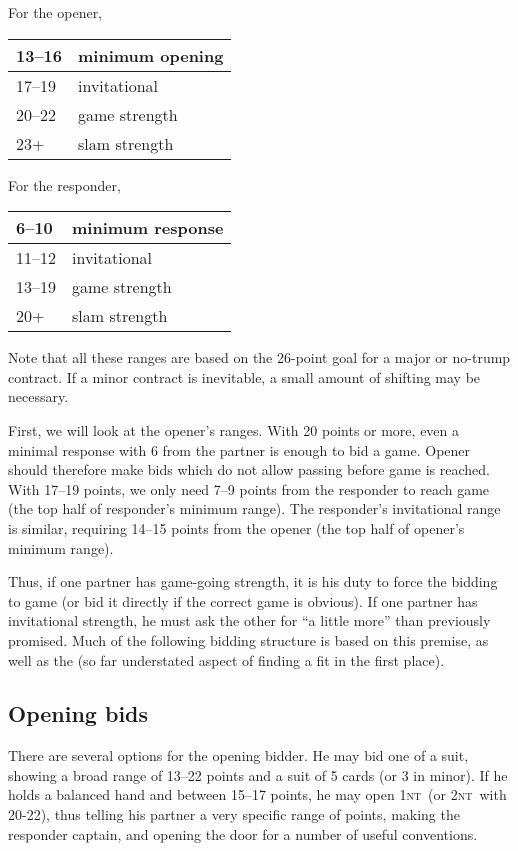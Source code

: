 \documentclass[11pt]{article}
\def\NT{\textsc{nt}}
\begin{document}
\begin{minipage}[t]{0.5\columnwidth}
For the opener,\\
\begin{tabular}{|l|l|}\hline
13--16 & minimum opening\\\hline
17--19 & invitational\\\hline
20--22 & game strength\\\hline
23+    & slam strength\\\hline
\end{tabular}
\end{minipage}
\begin{minipage}[t]{0.5\columnwidth}
For the responder,\\
\begin{tabular}{|l|l|}\hline
6--10  & minimum response\\\hline
11--12 & invitational\\\hline
13--19 & game strength \\\hline
20+    & slam strength\\\hline
\end{tabular}
\end{minipage}

Note that all these ranges are based on the 26-point goal for
a major or no-trump contract.  If a minor contract is inevitable,
a small amount of shifting may be necessary.

First, we will look at the opener's ranges.  With 20 points or more,
even a minimal response with 6 from the partner is enough to bid
a game.  Opener should therefore make bids which do not allow passing
before game is reached.  With 17--19 points, we only need 7--9 points
from the responder to reach game (the top half of responder's minimum
range).  The responder's invitational range is similar, requiring
14--15 points from the opener (the top half of opener's minimum range).

Thus, if one partner has game-going strength, it is his duty to
force the bidding to game (or bid it directly if the correct game
is obvious).  If one partner has invitational strength, he must ask
the other for ``a little more'' than previously promised.  Much of the
following bidding structure is based on this premise, as well as the
(so far understated aspect of finding a fit in the first place).

\subsection{Opening bids}
There are several options for the opening bidder.  He may bid one of a
suit, showing a broad range of 13--22 points and a suit of 5 cards (or
3 in minor).  If he holds a balanced hand and between 15--17 points,
he may open 1\NT\ (or 2\NT\ with 20-22), thus telling his partner a very
specific range of points, making the responder captain, and opening
the door for a number of useful conventions.
\end{document}
